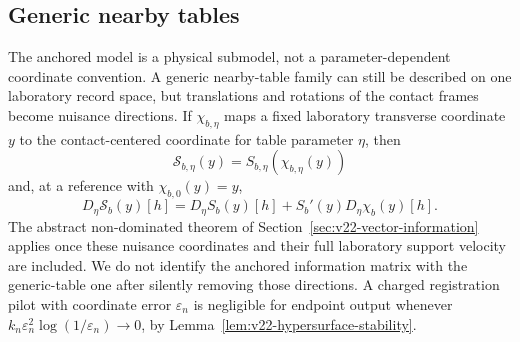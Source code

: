 \subsection{Generic nearby tables}

The anchored model is a physical submodel, not a parameter-dependent
coordinate convention.  A generic nearby-table family can still be described
on one laboratory record space, but translations and rotations of the contact
frames become nuisance directions.  If $\chi_{b,\eta}$ maps a fixed
laboratory transverse coordinate $y$ to the contact-centered coordinate for
table parameter $\eta$, then
\[
 \mathscr S_{b,\eta}(y)=S_{b,\eta}(\chi_{b,\eta}(y))
\]
and, at a reference with $\chi_{b,0}(y)=y$,
\begin{equation}\label{eq:v22-frame-motion-term}
 D_\eta\mathscr S_b(y)[h]
 =D_\eta S_b(y)[h]+S_b'(y)D_\eta\chi_b(y)[h].
\end{equation}
The abstract non-dominated theorem of
Section~\ref{sec:v22-vector-information} applies once these nuisance
coordinates and their full laboratory support velocity are included.  We do
not identify the anchored information matrix with the generic-table one after
silently removing those directions.  A charged registration pilot with
coordinate error $\varepsilon_n$ is negligible for endpoint output whenever
$k_n\varepsilon_n^2\log(1/\varepsilon_n)\to0$, by
Lemma~\ref{lem:v22-hypersurface-stability}.